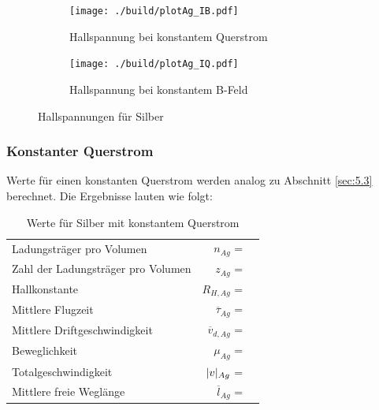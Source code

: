 \begin{figure}[H]
\begin{subfigure}{0.495\linewidth}
\centering
\texttt{[image: ./build/plotAg\_IB.pdf]}
\caption{Hallspannung bei konstantem Querstrom}
\end{subfigure}
\begin{subfigure}{0.495\linewidth}
\centering
\texttt{[image: ./build/plotAg\_IQ.pdf]}
\caption{Hallspannung bei konstantem B-Feld}
\end{subfigure}
\caption{Hallspannungen für Silber}
\end{figure}

\subsubsection{Konstanter Querstrom} \label{sec:5.4.1}

\justifying Werte für einen konstanten Querstrom werden analog zu Abschnitt \ref{sec:5.3} berechnet. Die Ergebnisse lauten wie folgt:

\begin{table}[H]
\centering
    \begin{tabular}{l r l}
    \toprule
        Ladungsträger pro Volumen               &$n_{Ag}$               = & \text{}  \\
        Zahl der Ladungsträger pro Volumen      &$z_{Ag}$               = & \text{}  \\
        Hallkonstante                           &$R_{H,Ag}$             = & \text{} \\
        Mittlere Flugzeit                       &$\overline{\tau}_{Ag}$ = & \text{}\\
        Mittlere Driftgeschwindigkeit           &$\overline{v}_{d,Ag}$  = & \text{}\\
        Beweglichkeit                           &$\mu_{Ag}$             = & \text{} \\
        Totalgeschwindigkeit                    &$\lvert v\rvert_{Ag}$         = & \text{}  \\
        Mittlere freie Weglänge                 &$\overline{l}_{Ag}$    = & \text{}  \\
        \bottomrule
    \end{tabular}
\caption{Werte für Silber mit konstantem Querstrom}
\label{tab:6}
\end{table}

